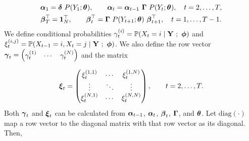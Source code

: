 \begin{gather}
    \boldsymbol{\alpha}_1 = \boldsymbol{\delta} ~ P(Y_1;\boldsymbol{\theta}), \qquad 
    \boldsymbol{\alpha}_t = \boldsymbol{\alpha}_{t-1} ~ \boldsymbol{\Gamma} ~ P(Y_t;\boldsymbol{\theta}), \quad t = 2,\ldots,T, \label{eqn:alpha} \\
    \boldsymbol{\beta}^\top_T = \mathbf{1}_N^\top, \qquad
    \boldsymbol{\beta}^\top_t = \boldsymbol{\Gamma} ~ P(Y_{t+1};\boldsymbol{\theta}) ~ \boldsymbol{\beta}^\top_{t+1}, \quad t = 1,\ldots,T-1. \label{eqn:beta}
\end{gather}
%
We define conditional probabilities $\gamma_t^{(i)} = \mathbb{P}(X_t = i \mid \mathbf{Y} ~;~ \boldsymbol{\phi})$ and $\xi_t^{(i,j)} = \mathbb{P}(X_{t-1} = i, X_t = j \mid \mathbf{Y} ~;~ \boldsymbol{\phi})$.
%
%
We also define the row vector $\boldsymbol{\gamma}_t = \begin{pmatrix} \gamma_t^{(1)} & \cdots & \gamma_t^{(N)} \end{pmatrix}$ and the matrix 

\begin{equation*}
    \boldsymbol{\xi}_t = \begin{pmatrix} 
    \xi_t^{(1,1)} & \cdots & \xi_t^{(1,N)} \\
    \vdots & \ddots & \vdots \\
    \xi_t^{(N,1)} & \cdots & \xi_t^{(N,N)} \\
    \end{pmatrix}, \qquad t = 2,\ldots,T. 
\end{equation*}
%
Both $\boldsymbol{\gamma}_t$ and $\boldsymbol{\xi}_t$ can be calculated from $\boldsymbol{\alpha}_{t-1}$, $\boldsymbol{\alpha}_t$, $\boldsymbol{\beta}_t$, $\boldsymbol{\Gamma}$, and $\boldsymbol{\theta}$. Let $\text{diag}(\cdot)$ map a row vector to the diagonal matrix with that row vector as its diagonal. Then,


